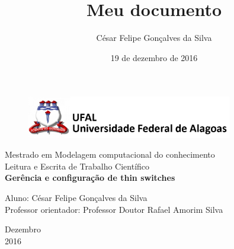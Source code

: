 \documentclass[12pt,a4paper]{article}
\title{Meu documento}
\author{César Felipe Gonçalves da Silva}
\date{19 de dezembro de 2016}
\begin{document}


\begin{titlepage}
	\begin{center}
	
	\begin{figure}[!ht]
	\centering
	\includegraphics[width=0.8\textwidth]{figuras/logo-ufal.png} %
	\end{figure}

		\large{Mestrado em Modelagem computacional do conhecimento}\\ 
		\large{Leitura e Escrita de Trabalho Científico}\\ 
		\vspace{15pt}
        \vspace{95pt}
        \textbf{\LARGE{Gerência e configuração de thin switches}}\\
		\vspace{3,5cm}
	\end{center}
	
	\begin{flushleft}
		\begin{tabbing}
			Aluno: César Felipe Gonçalves da Silva\\
			Professor orientador: Professor Doutor Rafael Amorim Silva \\
			\end{tabbing}
 \end{flushleft}
	\vspace{1cm}
	
	\begin{center}
		\vspace{\fill}
			 Dezembro\\
		 2016
			\end{center}
\end{titlepage}
\end{document}
